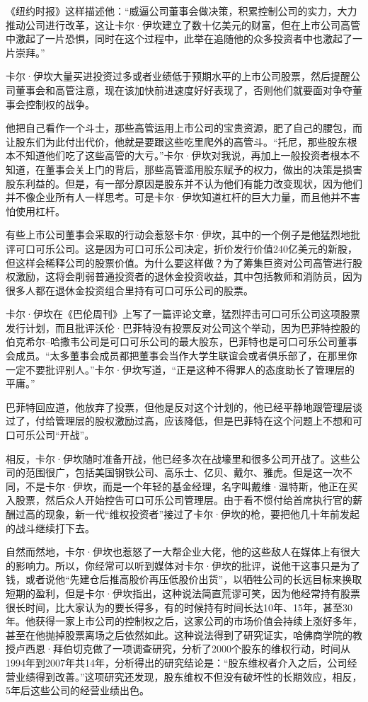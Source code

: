 《纽约时报》这样描述他：“威逼公司董事会做决策，积累控制公司的实力，大力推动公司进行改革，这让卡尔·伊坎建立了数十亿美元的财富，但在上市公司高管中激起了一片恐惧，同时在这个过程中，此举在追随他的众多投资者中也激起了一片崇拜。”

卡尔·伊坎大量买进投资过多或者业绩低于预期水平的上市公司股票，然后提醒公司董事会和高管注意，现在该加快前进速度好好表现了，否则他们就要面对争夺董事会控制权的战争。

他把自己看作一个斗士，那些高管运用上市公司的宝贵资源，肥了自己的腰包，而让股东们为此付出代价，他就是要跟这些吃里爬外的高管斗。“托尼，那些股东根本不知道他们吃了这些高管的大亏。”卡尔·伊坎对我说，再加上一般投资者根本不知道，在董事会关上门的背后，那些高管滥用股东赋予的权力，做出的决策是损害股东利益的。但是，有一部分原因是股东并不认为他们有能力改变现状，因为他们并不像企业所有人一样思考。可是卡尔·伊坎知道杠杆的巨大力量，而且他并不害怕使用杠杆。

有些上市公司董事会采取的行动会惹怒卡尔·伊坎，其中的一个例子是他猛烈地批评可口可乐公司。这是因为可口可乐公司决定，折价发行价值240亿美元的新股，但这样会稀释公司的股票价值。为什么要这样做？为了筹集巨资对公司高管进行股权激励，这将会削弱普通投资者的退休金投资收益，其中包括教师和消防员，因为很多人都在退休金投资组合里持有可口可乐公司的股票。

卡尔·伊坎在《巴伦周刊》上写了一篇评论文章，猛烈抨击可口可乐公司这项股票发行计划，而且批评沃伦·巴菲特没有投票反对公司这个举动，因为巴菲特控股的伯克希尔–哈撒韦公司是可口可乐公司的最大股东，巴菲特也是可口可乐公司董事会成员。“太多董事会成员都把董事会当作大学生联谊会或者俱乐部了，在那里你一定不要批评别人。”卡尔·伊坎写道，“正是这种不得罪人的态度助长了管理层的平庸。”

巴菲特回应道，他放弃了投票，但他是反对这个计划的，他已经平静地跟管理层谈过了，付给管理层的股权激励过高，应该降低，但是巴菲特在这个问题上不想和可口可乐公司“开战”。

相反，卡尔·伊坎随时准备开战，他已经多次在战壕里和很多公司开战了。这些公司的范围很广，包括美国钢铁公司、高乐士、亿贝、戴尔、雅虎。但是这一次不同，不是卡尔·伊坎，而是一个年轻的基金经理，名字叫戴维·温特斯，他正在买入股票，然后众人开始控告可口可乐公司管理层。由于看不惯付给首席执行官的薪酬过高的现象，新一代“维权投资者”接过了卡尔·伊坎的枪，要把他几十年前发起的战斗继续打下去。

自然而然地，卡尔·伊坎也惹怒了一大帮企业大佬，他的这些敌人在媒体上有很大的影响力。所以，你经常可以听到媒体对卡尔·伊坎的批评，说他干这事只是为了钱，或者说他“先建仓后推高股价再压低股价出货”，以牺牲公司的长远目标来换取短期的盈利，但是卡尔·伊坎指出，这种说法简直荒谬可笑，因为他经常持有股票很长时间，比大家认为的要长得多，有的时候持有时间长达10年、15年，甚至30年。他获得一家上市公司的控制权之后，这家公司的市场价值会持续上涨好多年，甚至在他抛掉股票离场之后依然如此。这种说法得到了研究证实，哈佛商学院的教授卢西恩·拜伯切克做了一项调查研究，分析了2000个股东的维权行动，时间从1994年到2007年共14年，分析得出的研究结论是：“股东维权者介入之后，公司经营业绩得到改善。”这项研究还发现，股东维权不但没有破坏性的长期效应，相反，5年后这些公司的经营业绩出色。

